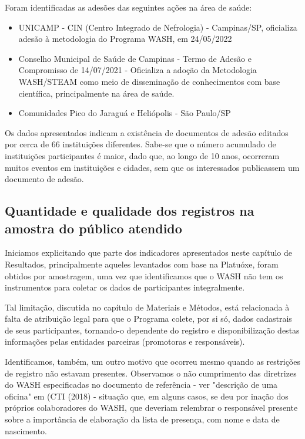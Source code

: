 Foram identificadas as adesões das seguintes ações na área de saúde:


\begin{itemize}
\item UNICAMP - CIN (Centro Integrado de Nefrologia) - Campinas/SP, oficializa adesão à metodologia do Programa WASH, em 24/05/2022
\item Conselho Municipal de  Saúde de Campinas - Termo de Adesão e Compromisso de 14/07/2021 - Oficializa a adoção da Metodologia WASH/STEAM como meio de disseminação de conhecimentos com base científica, principalmente na área de saúde.
\item Comunidades Pico do Jaraguá e Heliópolis - São Paulo/SP
\end{itemize}

Os dados apresentados indicam a existência de documentos de adesão editados por cerca de 66 instituições diferentes. Sabe-se que o número acumulado de instituições participantes é maior, dado que, ao longo de 10 anos, ocorreram muitos eventos em instituições e cidades, sem que os interessados publicassem um documento de adesão.

\subsection[Quantidade e qualidade dos registros na amostra do público atendido]{Quantidade e qualidade dos registros na amostra do público atendido}\label{Quantidade e qualidade dos registros na amostra do público atendido}
Iniciamos explicitando que parte dos indicadores apresentados neste capítulo de Resultados, principalmente aqueles levantados com base na Platuóxe, foram obtidos por amostragem, uma vez que identificamos que o WASH não tem os instrumentos para coletar os dados de participantes integralmente.

Tal limitação, discutida no capítulo de Materiais e Métodos, está relacionada à falta de atribuição legal para que o Programa colete, por si só, dados cadastrais de seus participantes, tornando-o dependente do registro e disponibilização destas informações pelas entidades parceiras (promotoras e responsáveis).

Identificamos, também, um outro motivo que ocorreu mesmo quando as restrições de registro não estavam presentes. Observamos o não cumprimento das diretrizes do WASH especificadas no documento de referência - ver "descrição de uma oficina" em (CTI (2018) - situação que, em alguns casos, se deu por inação dos próprios colaboradores do WASH, que deveriam relembrar o responsável presente sobre a importância de elaboração da lista de presença, com nome e data de nascimento.

